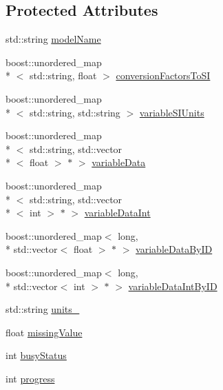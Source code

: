 \subsection*{Protected Attributes}
\begin{DoxyCompactItemize}
\item 
std\-::string \hyperlink{classccmc_1_1_model_a6165e9aac67ae0cbe536e350d03161f3}{model\-Name}
\item 
boost\-::unordered\-\_\-map\\*
$<$ std\-::string, float $>$ \hyperlink{classccmc_1_1_model_ab62ff417dd01ef7137490747cb0b3641}{conversion\-Factors\-To\-S\-I}
\item 
boost\-::unordered\-\_\-map\\*
$<$ std\-::string, std\-::string $>$ \hyperlink{classccmc_1_1_model_af782a4c86004df7b9388562551ae87ad}{variable\-S\-I\-Units}
\item 
boost\-::unordered\-\_\-map\\*
$<$ std\-::string, std\-::vector\\*
$<$ float $>$ $\ast$ $>$ \hyperlink{classccmc_1_1_model_a69edb30c3bc8ce3c68ec0a883c219d94}{variable\-Data}
\item 
boost\-::unordered\-\_\-map\\*
$<$ std\-::string, std\-::vector\\*
$<$ int $>$ $\ast$ $>$ \hyperlink{classccmc_1_1_model_a7dd720b592092ee2e1f24c162b712606}{variable\-Data\-Int}
\item 
boost\-::unordered\-\_\-map$<$ long, \\*
std\-::vector$<$ float $>$ $\ast$ $>$ \hyperlink{classccmc_1_1_model_ad73147779c03081227de041ffe4542a8}{variable\-Data\-By\-I\-D}
\item 
boost\-::unordered\-\_\-map$<$ long, \\*
std\-::vector$<$ int $>$ $\ast$ $>$ \hyperlink{classccmc_1_1_model_a699883059cbb36f977a724c7855b0d76}{variable\-Data\-Int\-By\-I\-D}
\item 
std\-::string \hyperlink{classccmc_1_1_model_ac6ae99aaeac03d14ffde2e82c39b436a}{units\-\_\-}
\item 
float \hyperlink{classccmc_1_1_model_ae18cabca92352739be2b97f0ee973475}{missing\-Value}
\item 
int \hyperlink{classccmc_1_1_model_acee07d9abc8cb8c0bc3fbaeb879cc251}{busy\-Status}
\item 
int \hyperlink{classccmc_1_1_model_a300d5ede0268098899a9fb248281ead5}{progress}
\end{DoxyCompactItemize}



